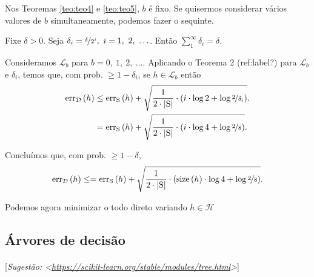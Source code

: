 Nos Teoremas \autoref{teo:teo4} e \autoref{teo:teo5}, $b$ é fixo. Se quisermos considerar vários valores de $b$ simultaneamente, podemos fazer o sequinte.

Fixe $\delta>0$. Seja $\delta_i=\nicefrac{\delta}{2^i},\ i=1,\ 2,\ \ldots$. Então $\sum_1^\infty \delta_i=\delta$.

Consideramos $\mathcal{L}_b$ para $b=0,\ 1,\ 2,\ \ldots$. Aplicando o Teorema 2 (ref:label?) para $\mathcal{L}_b$ e $\delta_i$, temos que, com prob. $\geq 1-\delta_i$, se $h\in\mathcal{L}_b$ então
\begin{align*}
  \mathrm{err}_\mathcal{D}\left(h\vphantom{1j}\right) &\leq \mathrm{err}_\mathrm{S}\left(h\vphantom{1j}\right) + \sqrt{\frac{1}{2\cdot\left|\mathrm{S}\vphantom{1j}\right|}\cdot\left(i\cdot\log2 + \log\nicefrac{2}{\delta_i}\vphantom{1j}\right)}. \\
                                  &= \mathrm{err}_\mathrm{S}\left(h\vphantom{1j}\right) + \sqrt{\frac{1}{2\cdot\left|\mathrm{S}\vphantom{1j}\right|}\cdot\left(i\cdot\log4 + \log\nicefrac{2}{8}\vphantom{1j}\right)}.
\end{align*}

Concluímos que, com prob. $\geq 1-\delta$,
\[
  \mathrm{err}_\mathcal{D}\left(h\vphantom{1j}\right) \leq = \mathrm{err}_\mathrm{S}\left(h\vphantom{1j}\right) + \sqrt{\frac{1}{2\cdot\left|\mathrm{S}\vphantom{1j}\right|}\cdot\left(\mathrm{size}\left(h\vphantom{1j}\right)\cdot\log4 + \log\nicefrac{2}{8}\vphantom{1j}\right)}.
\]

Podemos agora minimizar o todo direto variando $h\in\mathcal{H}$

\clearpage
\subsection{Árvores de decisão}

\paragraph{\nopunct}[\textit{Sugestão: <\href{https://scikit-learn.org/stable/modules/tree.html}{https://scikit-learn.org/stable/modules/tree.html}>}]

